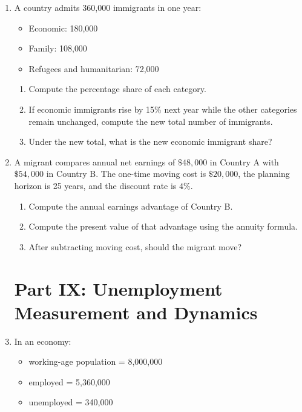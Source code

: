 \documentclass[12pt]{article}
\begin{document}
\begin{enumerate}
\section*{Part VIII: Immigration}

\item A country admits 360{,}000 immigrants in one year:
\begin{itemize}
    \item Economic: 180{,}000
    \item Family: 108{,}000
    \item Refugees and humanitarian: 72{,}000
\end{itemize}

\begin{enumerate}[label=(\alph*)]
    \item Compute the percentage share of each category.
    \item If economic immigrants rise by 15\% next year while the other categories remain unchanged, compute the new total number of immigrants.
    \item Under the new total, what is the new economic immigrant share?
\end{enumerate}

\item A migrant compares annual net earnings of \(\$48{,}000\) in Country A with \(\$54{,}000\) in Country B. The one-time moving cost is \(\$20{,}000\), the planning horizon is 25 years, and the discount rate is \(4\%\).

\begin{enumerate}[label=(\alph*)]
    \item Compute the annual earnings advantage of Country B.
    \item Compute the present value of that advantage using the annuity formula.
    \item After subtracting moving cost, should the migrant move?
\end{enumerate}

\section*{Part IX: Unemployment Measurement and Dynamics}

\item In an economy:
\begin{itemize}
    \item working-age population = 8{,}000{,}000
    \item employed = 5{,}360{,}000
    \item unemployed = 340{,}000
\end{itemize}


\end{enumerate}
\end{document}

